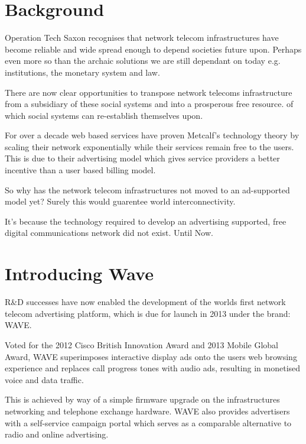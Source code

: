 \documentclass[letterpaper,10pt,openany,oneside,english]{sphinxmanual}
\begin{document}
\chapter{Background}
\label{\detokenize{background:background}}\label{\detokenize{background::doc}}
Operation Tech Saxon recognises that network telecom infrastructures have become reliable and wide spread enough to depend societies future upon. Perhaps even more so than the archaic solutions we are still dependant on today e.g. institutions, the monetary system and law.

There are now clear opportunities to transpose network telecoms infrastructure from a subsidiary of these social systems and into a prosperous free resource. of which social systems can re-establish themselves upon.

For over a decade web based services have proven Metcalf’s technology theory by scaling their network exponentially while their services remain free to the users. This is due to their advertising model which gives service providers a better incentive than a user based billing model.

So why has the network telecom infrastructures not moved to an ad-supported model yet? Surely this would guarentee world interconnectivity.

It’s because the technology required to develop an advertising supported, free digital communications network did not exist. Until Now.


\chapter{Introducing Wave}
\label{\detokenize{introducing-wave:introducing-wave}}\label{\detokenize{introducing-wave::doc}}
R\&D successes have now enabled the development of the worlds first network telecom advertising platform, which is due for launch in 2013 under the brand: WAVE.

Voted for the 2012 Cisco British Innovation Award and 2013 Mobile Global Award, WAVE superimposes interactive display ads onto the users web browsing experience and replaces call progress tones with audio ads, resulting in monetised voice and data traffic.

This is achieved by way of a simple firmware upgrade on the infrastructures networking and telephone exchange hardware. WAVE also provides advertisers with a self-service campaign portal which serves as a comparable alternative to radio and online advertising.
\end{document}
